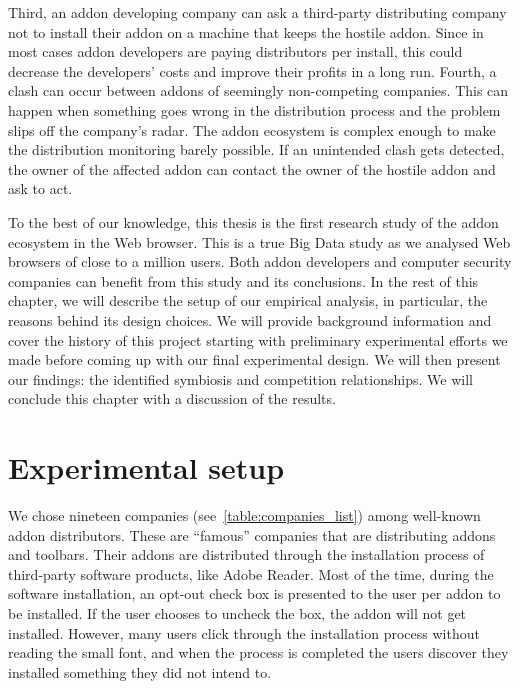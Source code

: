 \documentclass[11pt,oneside]{book}
\let\Oldsection\section
\renewcommand{\section}{\FloatBarrier\Oldsection}
\begin{document}
Third, an addon developing company can ask a third-party distributing company not to install their addon on a machine that keeps the hostile addon. Since in most cases addon developers are paying distributors per install, this could decrease the developers' costs and improve their profits in a long run.
Fourth, a clash can occur between addons of seemingly non-competing companies. This can happen when something goes wrong in the distribution process and the problem slips off the company's radar. The addon ecosystem is complex enough to make the distribution monitoring barely possible. If an unintended clash gets detected, the owner of the affected addon can contact the owner of the hostile addon and ask to act.

To the best of our knowledge, this thesis is the first research study of the addon ecosystem in the Web browser. This is a true Big Data study as we analysed Web browsers of close to a million users. Both addon developers and computer security companies can benefit from this study and its conclusions. In the rest of this chapter, we will describe the setup of our empirical analysis, in particular, the reasons behind its design choices. We will provide background information and cover the history of this project starting with preliminary experimental efforts we made before coming up with our final experimental design. We will then present our findings: the identified symbiosis and competition relationships. We will conclude this chapter with a discussion of the results.

\section{Experimental setup}
We chose nineteen companies (see~\autoref{table:companies_list}) among well-known addon distributors. These are ``famous'' companies that are distributing addons and toolbars. Their addons are distributed through the installation process of third-party software products, like Adobe Reader. Most of the time, during the software installation, an opt-out check box is presented to the user per addon to be installed. If the user chooses to uncheck the box, the addon will not get installed. However, many users click through the installation process without reading the small font, and when the process is completed the users discover they installed something they did not intend to. 
\end{document}
